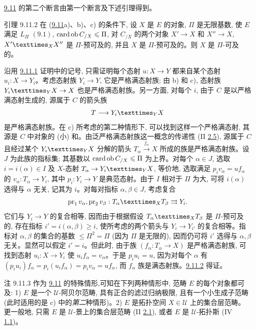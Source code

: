 \hyperref[I.prop9.11]{9.11} 的第二个断言由第一个断言及下述引理得到。

\begin{enonce*}{引理 9.11.2}
在 (\hyperref[I.prop9.11]{9.11}a)、b)、c) 的条件下, 设 $X$ 是 $E$ 的对象, $\Pi$ 是无限基数, 使 $E$ 满足 $L_{\Pi}$ $\hyperref[I.def9.1]{(9.1)}$, $\operatorname{card}\operatorname{ob} C_{/X}\leqslant\Pi$, 对 $C_{/X}$ 的两个对象 $X'\rightarrow X$ 和 $X''\rightarrow X$, $\fprod{X'}{X''}{X}$ 是 $\Pi$-预可及的, 并且 $X$ 是 $\Pi$-预可及的。则 $X$ 是 $\Pi$-可及的。
\end{enonce*}

沿用 \hyperref[I.lem9.11.1]{9.11.1} 证明中的记号, 只需证明每个态射 $u:X\rightarrow Y$ 都来自某个态射 $u_i:X\rightarrow Y_i$。考虑态射族 $Y_i\rightarrow Y$, 它是严格满态射族; 由 b) 和 c), 态射族 $\fprod{Y_i}{X}{Y}\rightarrow X$ 也是严格满态射族。另一方面, 对每个 $i$, 由于 $C$ 是以严格满态射生成的, 源属于 $C$ 的箭头族
$$
T\longrightarrow \fprod{Y_i}{X}{Y}
$$
是严格满态射族\pageoriginale。在 c) 所考虑的第二种情形下, 可以找到这样一个严格满态射, 其源是 $C$ 中对象的 (小) 和。由泛严格满态射族这一概念的传递性 (II \hyperref[II.def2.5]{2.5}), 源属于 $C$ 且经过某个 $\fprod{Y_i}{X}{Y}$ 分解的箭头 $T_\alpha\xrightarrow{f_\alpha}X$ 所成的族是严格满态射族。设 $J$ 为此族的指标集; 其基数以 $\operatorname{card}\operatorname{ob} C_{/X}\leqslant\Pi$ 为上界。对每个 $\alpha\in J$, 选取 $i=i(\alpha)\in I$ 及 $X$-态射 $T_\alpha\rightarrow\fprod{Y_i}{X}{Y}$, 等价地, 选取满足 $p_iv_\alpha=uf_\alpha$ 的 $v_\alpha:T_\alpha\rightarrow Y_i$, 其中 $p_i:Y_i\rightarrow Y$ 是典范态射。由于 $I$ 相对于 $\Pi$ 为大, 可将 $i(\alpha)$ 选得与 $\alpha$ 无关, 记其为 $i$。对每对指标 $\alpha,\beta\in J$, 考虑复合
$$
\pr_1v_\alpha,\pr_2v_\beta:
\fprod{T_\alpha}{T_\beta}{X}\rightrightarrows Y_i{\quoi}.
$$
它们与 $Y_i\rightarrow Y$ 的复合相等, 因而由于根据假设 $\fprod{T_\alpha}{T_\beta}{X}$ 是 $\Pi$-预可及的, 存在指标 $i'=i(\alpha,\beta)\geq i$, 使所考虑的两个箭头与 $Y_i\rightarrow Y_{i'}$ 的复合相等。指标对 $\alpha,\beta$ 的集合的基数 $\leq\Pi^2=\Pi$ (因为 $\Pi$ 是无限的), 因而仍可将 $i'$ 选得与 $\alpha,\beta$ 无关。显然可以假定 $i'=i$。但此时, 由于族 $(f_\alpha:T_\alpha\rightarrow X)$ 是严格满态射族, 可找到态射 $u_i:X\rightarrow Y_i$ 使 $u_if_\alpha=v_\alpha$。于是 $p_iu_i=u$, 因为对每个 $\alpha$ 有 $(p_iu_i)f_\alpha=p_i(u_if_\alpha)=p_iv_\alpha=uf_\alpha$, 而 $f_\alpha$ 族是满态射族。\hyperref[I.lem9.11.2]{9.11.2} 得证。

\begin{enonce*}[remark]{注 9.11.3}
作为 \hyperref[I.prop9.11]{9.11} 的特殊情形,\pageoriginale 可知在下列两种情形中, 范畴 $E$ 的每个对象都可及: 1) $E$ 是一个 $𝒰$-阿贝尔范畴, 具有正合的滤过归纳极限, 且有一个小生成子范畴 (此时适用的是 c) 中的\emph{第二}种情形)。2) $E$ 是拓扑空间 $X\in 𝒰$ 上的集合层范畴。更一般地, 只需 $E$ 是 $𝒰$-景上的集合层范畴 (II \hyperref[II.def2.1]{2.1}), 或者 $E$ 是 $𝒰$-拓扑斯 (IV \hyperref[IV.def1.1]{1.1})。
\end{enonce*}

